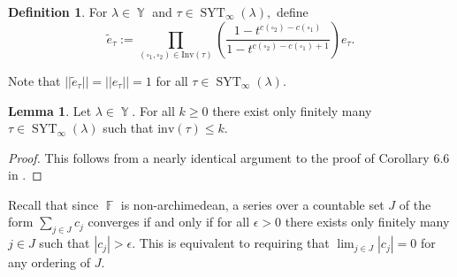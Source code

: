 \documentclass[12pt,reqno]{amsart}
\theoremstyle{definition}
\newtheorem{lem}[thm]{Lemma}
\newtheorem{defn}[thm]{Definition}
\DeclareMathOperator{\bF}{\mathbb{F}}
\DeclareMathOperator{\SYT}{\mathrm{SYT}}
\DeclareMathOperator{\Par}{\mathbb{Y}}
\begin{document}
\begin{defn}\label{normalization defn}
    For $\lambda \in \Par$ and $\tau \in \SYT_{\infty}(\lambda),$ define 
    $$\tilde{e}_{\tau}:= \prod_{(\square_1,\square_2) \in \mathrm{Inv}(\tau)} \left(\frac{1-t^{c(\square_2)-c(\square_1)}}{1-t^{c(\square_2)-c(\square_1)+1}} \right) e_{\tau}.$$
\end{defn}

Note that $||\tilde{e}_{\tau}|| = ||e_{\tau}|| = 1$ for all $\tau \in \SYT_{\infty}(\lambda).$

\begin{lem}\label{lem bounds on inv}
    Let $\lambda \in \Par.$ For all $k \geq 0$ there exist only finitely many $\tau \in \SYT_{\infty}(\lambda)$ such that $\mathrm{inv}(\tau) \leq k.$
\end{lem}
\begin{proof}
    This follows from a nearly identical argument to the proof of Corollary 6.6 in \cite{BWMurnaghan}.
\end{proof}

Recall that since $\bF$ is non-archimedean, a series over a countable set $J$ of the form $\sum_{j \in J} c_{j}$ converges if and only if for all $\epsilon> 0$ there exists only finitely many $j \in J$ such that $|c_{j}| > \epsilon.$ This is equivalent to requiring that $\lim_{j \in J} |c_j| = 0$ for any ordering of $J.$
\end{document}
